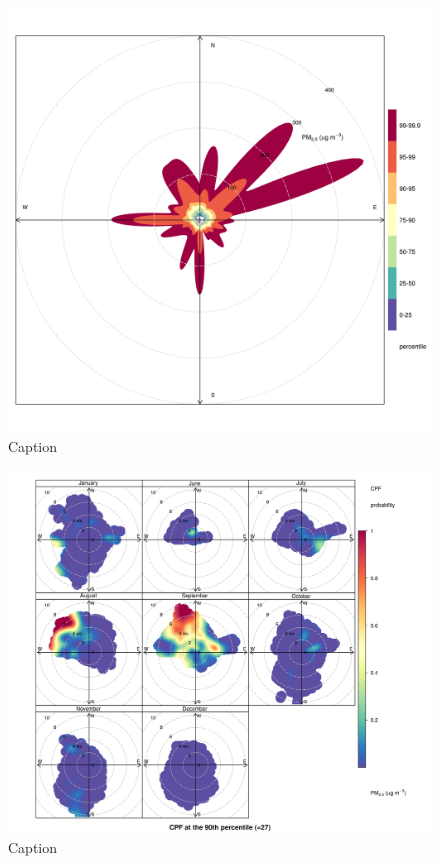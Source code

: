 \documentclass{nwureport}
\begin{document}
\begin{figure}[!htb]
    \centering
    \includegraphics[width=\textwidth]{images/Wedela_pm2-5_percentileRose.png}
    \caption{Caption}
    \label{fig:summary}
\end{figure}

\begin{figure}[!htb]
    \centering
    \includegraphics[width=\textwidth]{images/Wedela_pm2-5_polar.png}
    \caption{Caption}
    \label{fig:summary}
\end{figure}
\end{document}
